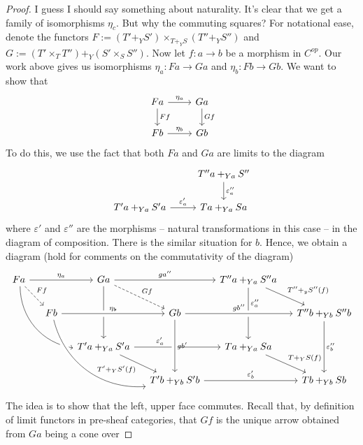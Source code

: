 \documentclass[12pt]{article}
\renewcommand{\epsilon}{\varepsilon}
\newcommand{\from}{\colon}
\renewcommand{\(}{\left(}
\renewcommand{\)}{\right)}
\renewcommand{\{}{\left\lbrace}
\renewcommand{\}}{\right\rbrace}
\theoremstyle{remark}
\theoremstyle{definition}
\begin{document}
\begin{proof}
	I guess I should say something about naturality.  It's clear that we get a family of isomorphisms $\eta_c$. But why the commuting squares? For notational ease, denote the functors $F := (T' +_Y S') \times_{T +_Y S} (T''+_Y S'')$ and $G:=  (T' \times_{T} T'') +_{Y} (S' \times_{S} S'') $.  Now let $f \from a \to b$ be a morphism in $C^{op}$.  Our work above gives us isomorphisms $\eta_a \from Fa \to Ga$ and $\eta_b \from Fb \to Gb$.  We want to show that
	\[
		\begin{tikzcd}
			{Fa} 
				\ar[r,"\eta_a"]
				\ar[d,"Ff"] &
			{Ga} 
				\ar[d,"Gf"] \\
			{Fb} 
				\ar[r,"\eta_b"]&
			{Gb} 
		\end{tikzcd}
	\]
	To do this, we use the fact that both $Fa$ and $Ga$ are limits to the diagram
	\[
		\begin{tikzcd}
			{} &
			{T''a +_{Ya} S''} 
				\ar[d,"\epsilon''_a"] \\
			{T'a +_{Ya} S'a } 
				\ar[r, "\epsilon'_a"] &
			{Ta +_{Ya} Sa}
		\end{tikzcd}
	\]
	where $\epsilon'$ and $\epsilon''$ are the morphisms -- natural transformations in this case -- in the diagram of composition. There is the similar situation for $b$.  Hence, we obtain a diagram (hold for comments on the commutativity of the diagram)
	\[
		\begin{tikzcd}[column sep=small]
			{Fa} 
				\ar[rr, "\eta_a"]
				\ar[dr,dashed,"Ff"] 
				\ar[ddrr,bend right=40em] &
			{} &
			{Ga} 
				\ar[rr,"ga''"]
				\ar[dr,dashed,"Gf"] 
				\ar[dd,"ga'"] &
			{} &
			{T''a +_{Ya} S''a} 
				\ar[dr, "T''+_yS''(f)" ]
				\ar[dd,pos=.3,"\epsilon''_a"] &
			{} \\
			{} &
			{Fb} 
				\ar[rr,"\eta_b",crossing over]
				\ar[ddrr,bend right=40em,crossing over] &
			{} &
			{Gb} 
				\ar[rr,crossing over,"gb''"] &
			{} &
			{T''b +_{Yb} S''b} 
				\ar[dd,"\epsilon''_b"] \\
			{} &
			{} &
			{T'a +_{Ya} S'a} 
				\ar[rr,pos=.3,"\epsilon'_a"]
				\ar[dr,swap,"T'+_YS'(f)"] &
			{} &
			{Ta +_{Ya} Sa} 
				\ar[dr, "T+_YS(f)"] &
			{} \\
			{} &
			{} &
			{} &
			{T'b +_{Yb} S'b} 
				\ar[rr,"\epsilon_b'"]&
			{} &
			{Tb +_{Yb} Sb} 
			\ar[from=2-4,to=4-4,crossing over, "gb'"]
		\end{tikzcd}
	\]  
	The idea is to show that the left, upper face commutes.  Recall that, by definition of limit functors in pre-sheaf categories, that $Gf$ is the unique arrow obtained from $Ga$ being a cone over

\end{proof}
\end{document}
